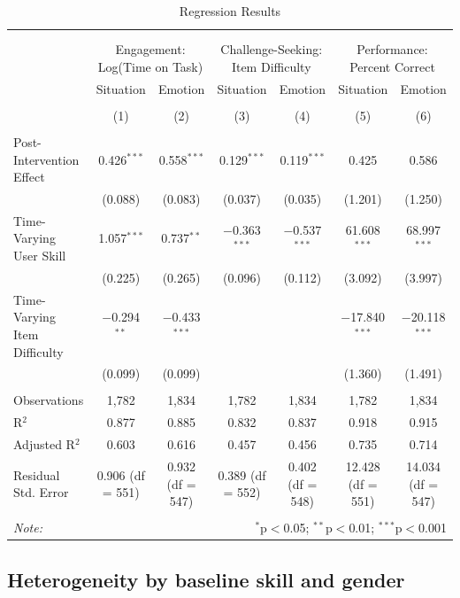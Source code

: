 \documentclass[11pt]{report}
\begin{document}
\begin{mainf}
\begin{table}[!htbp] \centering    \caption{Regression Results}    \label{tab:main_reg}  \begin{tabular}{@{\extracolsep{5pt}}lcccccc}  \\[-1.8ex]\hline \\[-1.8ex]  \\[-1.8ex] & \multicolumn{2}{c}{Engagement: Log(Time on Task)} & \multicolumn{2}{c}{Challenge-Seeking: Item Difficulty} & \multicolumn{2}{c}{Performance: Percent Correct} \\   & Situation & Emotion & Situation & Emotion & Situation & Emotion \\  \\[-1.8ex] & (1) & (2) & (3) & (4) & (5) & (6)\\  \hline \\[-1.8ex]   Post-Intervention Effect & 0.426$^{***}$ & 0.558$^{***}$ & 0.129$^{***}$ & 0.119$^{***}$ & 0.425 & 0.586 \\    & (0.088) & (0.083) & (0.037) & (0.035) & (1.201) & (1.250) \\    Time-Varying User Skill & 1.057$^{***}$ & 0.737$^{**}$ & $-$0.363$^{***}$ & $-$0.537$^{***}$ & 61.608$^{***}$ & 68.997$^{***}$ \\    & (0.225) & (0.265) & (0.096) & (0.112) & (3.092) & (3.997) \\    Time-Varying Item Difficulty & $-$0.294$^{**}$ & $-$0.433$^{***}$ &  &  & $-$17.840$^{***}$ & $-$20.118$^{***}$ \\    & (0.099) & (0.099) &  &  & (1.360) & (1.491) \\   \hline \\[-1.8ex]  Observations & 1,782 & 1,834 & 1,782 & 1,834 & 1,782 & 1,834 \\  R$^{2}$ & 0.877 & 0.885 & 0.832 & 0.837 & 0.918 & 0.915 \\  Adjusted R$^{2}$ & 0.603 & 0.616 & 0.457 & 0.456 & 0.735 & 0.714 \\  Residual Std. Error & 0.906 (df = 551) & 0.932 (df = 547) & 0.389 (df = 552) & 0.402 (df = 548) & 12.428 (df = 551) & 14.034 (df = 547) \\  \hline \\[-1.8ex]  \textit{Note:}  & \multicolumn{6}{r}{$^{*}$p$<$0.05; $^{**}$p$<$0.01; $^{***}$p$<$0.001} \\  \end{tabular}  \end{table} 

\subsection*{Heterogeneity by baseline skill and gender}


\end{mainf}
\end{document}
